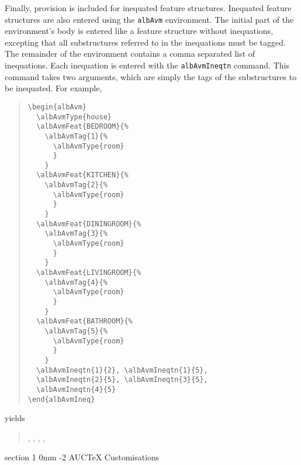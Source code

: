 \documentclass[11pt,a4paper,oneside]{article}
\makeatletter
\renewcommand{\section}{\@startsection%
  {section}%
  {1}%
  {0mm}%
  {-2\baselineskip}%
  {\baselineskip}%
  {\normalfont\sffamily\bfseries\Large}%
  }
\newcommand{\AUCTeX}[0]{AUC\TeX{}}
\makeatother
\begin{document}
Finally, provision is included for inequated feature structures.
Inequated feature structures are also entered using the \texttt{albAvm}
environment.  The initial part of the environment's body is entered like
a feature structure without inequations, excepting that all
substructures referred to in the inequations must be tagged.  The
remainder of the environment contains a comma separated list of
inequations.  Each inequation is entered with the \texttt{albAvmIneqtn}
command.  This command takes two arguments, which are simply the tags of
the substructures to be inequated.  For example,
\begin{quote}
\begin{verbatim}
\begin{albAvm}
  \albAvmType{house}
  \albAvmFeat{BEDROOM}{%
    \albAvmTag{1}{%
      \albAvmType{room}
      }
    }
  \albAvmFeat{KITCHEN}{%
    \albAvmTag{2}{%
      \albAvmType{room}
      }
    }
  \albAvmFeat{DININGROOM}{%
    \albAvmTag{3}{%
      \albAvmType{room}
      }
    }
  \albAvmFeat{LIVINGROOM}{%
    \albAvmTag{4}{%
      \albAvmType{room}
      }
    }
  \albAvmFeat{BATHROOM}{%
    \albAvmTag{5}{%
      \albAvmType{room}
      }
    }
  \albAvmIneqtn{1}{2}, \albAvmIneqtn{1}{5},
  \albAvmIneqtn{2}{5}, \albAvmIneqtn{3}{5},
  \albAvmIneqtn{4}{5}
\end{albAvmIneq}
\end{verbatim}
\end{quote}
yields
\begin{quote}
  \begin{albAvm}
    , ,
    , ,
  \end{albAvm}
\end{quote}
 



\section{\AUCTeX{} Customisations}
\label{sec:avm-examples:auctex-cust}
\end{document}
